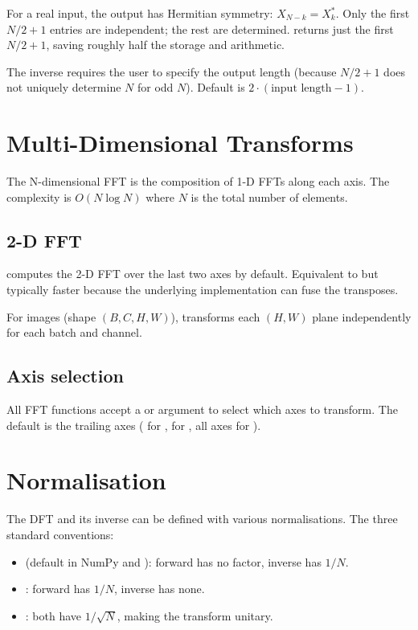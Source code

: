 For a real input, the output has Hermitian symmetry: $X_{N-k} =
X_k^*$. Only the first $N/2 + 1$ entries are independent; the
rest are determined.  returns just the first $N/2 +
1$, saving roughly half the storage and arithmetic.

The inverse  requires the user to specify the output
length (because $N/2 + 1$ does not uniquely determine $N$ for
odd $N$). Default is $2 \cdot (\text{input length} - 1)$.

\section{Multi-Dimensional Transforms}
\label{sec:fft:multi_dim}

The N-dimensional FFT is the composition of 1-D FFTs along each
axis. The complexity is $O(N \log N)$ where $N$ is the total
number of elements.

\subsection{2-D FFT}
\label{ssec:fft:fft2}

 computes the 2-D FFT over the last two axes by
default. Equivalent to  but
typically faster because the underlying implementation can fuse
the transposes.

For images (shape $(B, C, H, W)$),  transforms each
$(H, W)$ plane independently for each batch and channel.

\subsection{Axis selection}
\label{ssec:fft:axis_select}

All FFT functions accept a  or  argument to
select which axes to transform. The default is the trailing
axes ( for ,  for
, all axes for ).

\section{Normalisation}
\label{sec:fft:norm}

The DFT and its inverse can be defined with various
normalisations. The three standard conventions:

\begin{itemize}
  \item {} (default in NumPy and \Lucid):
    forward has no factor, inverse has $1/N$.
  \item {}: forward has $1/N$, inverse has
    none.
  \item {}: both have $1/\sqrt{N}$, making the
    transform unitary.
\end{itemize}

